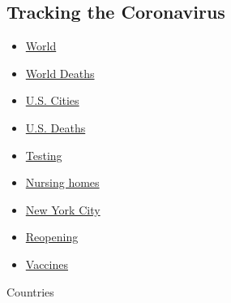 \hypertarget{tracking-the-coronavirus}{%
\subsection{Tracking the Coronavirus}\label{tracking-the-coronavirus}}

\begin{itemize}
\tightlist
\item
  \href{https://www.nytimes3xbfgragh.onion/interactive/2020/world/coronavirus-maps.html}{World}
\item
  \href{https://www.nytimes3xbfgragh.onion/interactive/2020/04/21/world/coronavirus-missing-deaths.html}{World
  Deaths}
\item
  \href{https://www.nytimes3xbfgragh.onion/interactive/2020/04/23/upshot/five-ways-to-monitor-coronavirus-outbreak-us.html}{U.S.
  Cities}
\item
  \href{https://www.nytimes3xbfgragh.onion/interactive/2020/05/05/us/coronavirus-death-toll-us.html}{U.S.
  Deaths}
\item
  \href{https://www.nytimes3xbfgragh.onion/interactive/2020/us/coronavirus-testing.html}{Testing}
\item
  \href{https://www.nytimes3xbfgragh.onion/interactive/2020/us/coronavirus-nursing-homes.html}{Nursing
  homes}
\item
  \href{https://www.nytimes3xbfgragh.onion/interactive/2020/nyregion/new-york-city-coronavirus-cases.html}{New
  York City}
\item
  \href{https://www.nytimes3xbfgragh.onion/interactive/2020/us/states-reopen-map-coronavirus.html}{Reopening}
\item
  \href{https://www.nytimes3xbfgragh.onion/interactive/2020/science/coronavirus-vaccine-tracker.html}{Vaccines}
\end{itemize}

Countries

